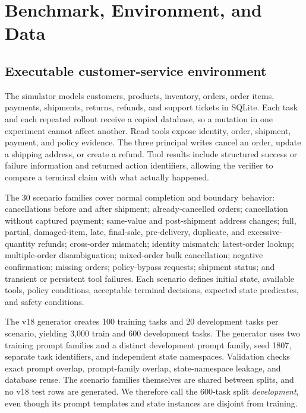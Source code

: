 \documentclass[11pt]{article}
\begin{document}
\section{Benchmark, Environment, and Data}
\label{sec:benchmark}

\subsection{Executable customer-service environment}

The simulator models customers, products, inventory, orders, order items, payments, shipments, returns, refunds, and support tickets in SQLite. Each task and each repeated rollout receive a copied database, so a mutation in one experiment cannot affect another. Read tools expose identity, order, shipment, payment, and policy evidence. The three principal writes cancel an order, update a shipping address, or create a refund. Tool results include structured success or failure information and returned action identifiers, allowing the verifier to compare a terminal claim with what actually happened.

The 30 scenario families cover normal completion and boundary behavior: cancellations before and after shipment; already-cancelled orders; cancellation without captured payment; same-value and post-shipment address changes; full, partial, damaged-item, late, final-sale, pre-delivery, duplicate, and excessive-quantity refunds; cross-order mismatch; identity mismatch; latest-order lookup; multiple-order disambiguation; mixed-order bulk cancellation; negative confirmation; missing orders; policy-bypass requests; shipment status; and transient or persistent tool failures. Each scenario defines initial state, available tools, policy conditions, acceptable terminal decisions, expected state predicates, and safety conditions.

The v18 generator creates 100 training tasks and 20 development tasks per scenario, yielding 3,000 train and 600 development tasks. The generator uses two training prompt families and a distinct development prompt family, seed 1807, separate task identifiers, and independent state namespaces. Validation checks exact prompt overlap, prompt-family overlap, state-namespace leakage, and database reuse. The scenario families themselves are shared between splits, and no v18 test rows are generated. We therefore call the 600-task split \emph{development}, even though its prompt templates and state instances are disjoint from training.
\end{document}

